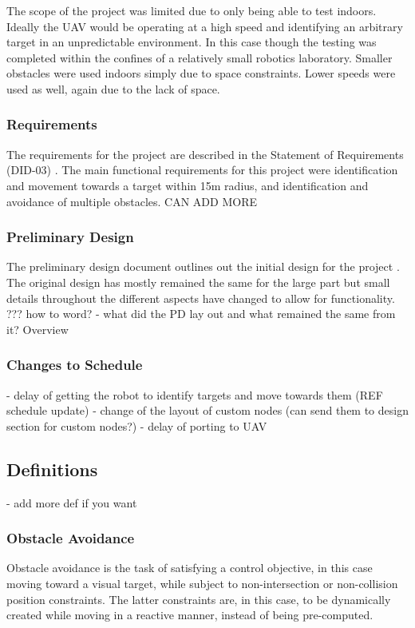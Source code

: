 \documentclass{article}
\begin{document}
	The scope of the project was limited due to only being able to test indoors. Ideally the UAV would be operating at a high speed and identifying an arbitrary target in an unpredictable environment. In this case though the testing was completed within the confines of a relatively small robotics laboratory. Smaller obstacles were used indoors simply due to space constraints. Lower speeds were used as well, again due to the lack of space. 


		\subsubsection{Requirements}
	The requirements for the project are described in the Statement of Requirements (DID-03) \cite{sor}. The main functional requirements for this project were identification and movement towards a target within 15m radius, and identification and avoidance of multiple obstacles. CAN ADD MORE

		\subsubsection{Preliminary Design}
	The preliminary design document outlines out the initial design for the project \cite{pdd}. 
The original design has mostly remained the same for the large part but small details throughout the different aspects have changed to allow for functionality. ??? how to word?
	- what did the PD lay out and what remained the same from it? Overview

		\subsubsection{Changes to Schedule}

	- delay of getting the robot to identify targets and move towards them (REF schedule update) \cite{schupd}
	- change of the layout of custom nodes (can send them to design section for custom nodes?)
	- delay of porting to UAV

	\subsection{Definitions}
	- add more def if you want
	
		\subsubsection{Obstacle Avoidance}
		
		
		Obstacle avoidance is the task of satisfying a control objective, in this case moving toward a visual target, while subject to non-intersection or non-collision position constraints. The latter constraints are, in this case, to be dynamically created while moving in a reactive manner, instead of being pre-computed.
		
\end{document}
